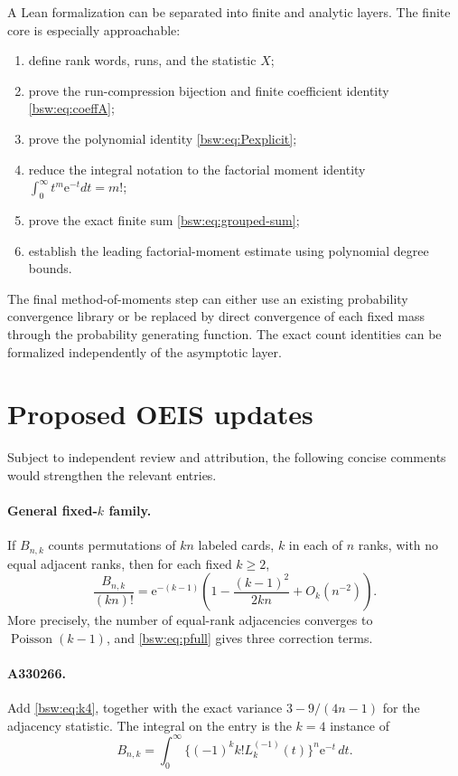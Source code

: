 \documentclass[11pt,letterpaper]{article}
\theoremstyle{definition}
\theoremstyle{remark}
\newcommand{\ee}{\mathrm e}
\newcommand{\Pois}{\operatorname{Poisson}}
\begin{document}
A Lean formalization can be separated into finite and analytic layers.
The finite core is especially approachable:
\begin{enumerate}[leftmargin=2em]
\item define rank words, runs, and the statistic $X$;
\item prove the run-compression bijection and finite coefficient identity
\eqref{bsw:eq:coeffA};
\item prove the polynomial identity \eqref{bsw:eq:Pexplicit};
\item reduce the integral notation to the factorial moment identity
$\int_0^\infty t^m\ee^{-t}dt=m!$;
\item prove the exact finite sum \eqref{bsw:eq:grouped-sum};
\item establish the leading factorial-moment estimate using polynomial degree
bounds.
\end{enumerate}
The final method-of-moments step can either use an existing probability
convergence library or be replaced by direct convergence of each fixed mass
through the probability generating function.  The exact count identities can
be formalized independently of the asymptotic layer.

\section{Proposed OEIS updates}

Subject to independent review and attribution, the following concise comments
would strengthen the relevant entries.

\paragraph{General fixed-$k$ family.}
If $B_{n,k}$ counts permutations of $kn$ labeled cards, $k$ in each of $n$
ranks, with no equal adjacent ranks, then for each fixed $k\ge2$,
\[
 \frac{B_{n,k}}{(kn)!}=\ee^{-(k-1)}\left(1-\frac{(k-1)^2}{2kn}
 +O_k(n^{-2})\right).
\]
More precisely, the number of equal-rank adjacencies converges to
$\Pois(k-1)$, and \eqref{bsw:eq:pfull} gives three correction terms.

\paragraph{A330266.}
Add \eqref{bsw:eq:k4}, together with the exact variance
$3-9/(4n-1)$ for the adjacency statistic.  The integral on the entry is the
$k=4$ instance of
\[
 B_{n,k}=\int_0^\infty
 \{(-1)^kk!L_k^{(-1)}(t)\}^n\ee^{-t}\,dt.
\]
\end{document}
